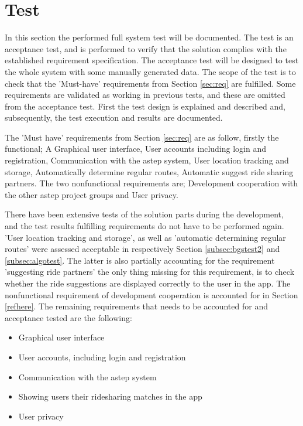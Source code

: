 \section{Test}
In this section the performed full system test will be documented.
The test is an acceptance test, and is performed to verify that the solution complies with the established requirement specification.
The acceptance test will be designed to test the whole system with some manually generated data.
The scope of the test is to check that the 'Must-have' requirements from Section \ref{sec:req} are fulfilled.
Some requirements are validated as working in previous tests, and these are omitted from the acceptance test. 
First the test design is explained and described and, subsequently, the test execution and results are documented.

The 'Must have' requirements from Section \ref{sec:req} are as follow, firstly the functional; A Graphical user interface, User accounts including login and registration, Communication with the \gls{astep} system, User location tracking and storage, Automatically determine regular routes, Automatic suggest ride sharing partners. The two nonfunctional requirements are; Development cooperation with the other \gls{astep} project groups and User privacy.

There have been extensive tests of the solution parts during the development, and the test results fulfilling requirements do not have to be performed again.
'User location tracking and storage', as well as 'automatic determining regular routes' were assessed acceptable in respectively Section \ref{subsec:bgstest2} and \ref{subsec:algotest}.
The latter is also partially accounting for the requirement 'suggesting ride partners' the only thing missing for this requirement, is to check whether the ride suggestions are displayed correctly to the user in the app. 
The nonfunctional requirement of development cooperation is accounted for in Section \ref{refhere}. 
The remaining requirements that needs to be accounted for and acceptance tested are the following:
\begin{itemize}
	\item Graphical user interface
	\item User accounts, including login and registration
	\item Communication with the \gls{astep} system
	\item Showing users their ridesharing matches in the app
	\item User privacy
\end{itemize}

